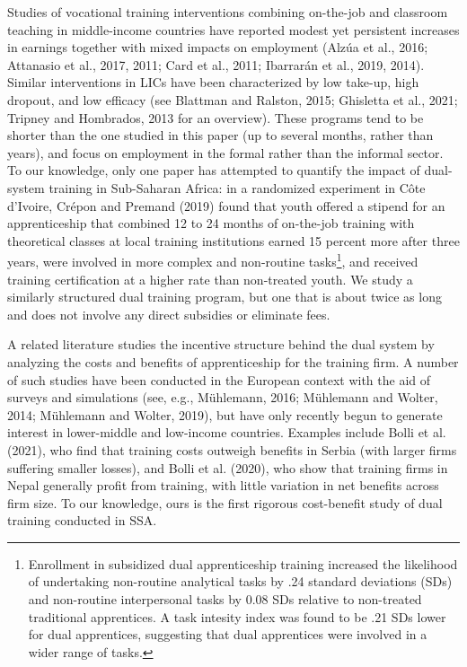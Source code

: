 \documentclass[
  11pt,
a4paper
]{report}
\begin{document}
Studies of vocational training interventions combining on-the-job and classroom teaching in middle-income countries have reported modest yet persistent increases in earnings together with mixed impacts on employment (Alzúa et al., 2016; Attanasio et al., 2017, 2011; Card et al., 2011; Ibarrarán et al., 2019, 2014). Similar interventions in LICs have been characterized by low take-up, high dropout, and low efficacy (see Blattman and Ralston, 2015; Ghisletta et al., 2021; Tripney and Hombrados, 2013 for an overview). These programs tend to be shorter than the one studied in this paper (up to several months, rather than years), and focus on employment in the formal rather than the informal sector. To our knowledge, only one paper has attempted to quantify the impact of dual-system training in Sub-Saharan Africa: in a randomized experiment in Côte d'Ivoire, Crépon and Premand (2019) found that youth offered a stipend for an apprenticeship that combined 12 to 24 months of on-the-job training with theoretical classes at local training institutions earned 15 percent more after three years, were involved in more complex and non-routine tasks\footnote{Enrollment in subsidized dual apprenticeship training increased the likelihood of undertaking non-routine analytical tasks by .24 standard deviations (SDs) and non-routine interpersonal tasks by 0.08 SDs relative to non-treated traditional apprentices. A task intesity index was found to be .21 SDs lower for dual apprentices, suggesting that dual apprentices were involved in a wider range of tasks.}, and received training certification at a higher rate than non-treated youth. We study a similarly structured dual training program, but one that is about twice as long and does not involve any direct subsidies or eliminate fees.

A related literature studies the incentive structure behind the dual system by analyzing the costs and benefits of apprenticeship for the training firm. A number of such studies have been conducted in the European context with the aid of surveys and simulations (see, e.g., Mühlemann, 2016; Mühlemann and Wolter, 2014; Mühlemann and Wolter, 2019), but have only recently begun to generate interest in lower-middle and low-income countries. Examples include Bolli et al. (2021), who find that training costs outweigh benefits in Serbia (with larger firms suffering smaller losses), and Bolli et al. (2020), who show that training firms in Nepal generally profit from training, with little variation in net benefits across firm size. To our knowledge, ours is the first rigorous cost-benefit study of dual training conducted in SSA.
\end{document}
